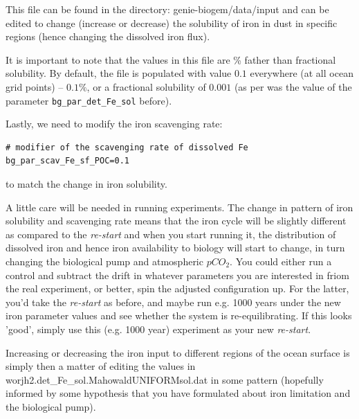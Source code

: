 \vspace{1mm}
This file can be found in the directory: \textsf{\footnotesize genie-biogem/data/input} and can be edited to change (increase or decrease) the solubility of iron in dust in specific regions (hence changing the dissolved iron flux). 

It is important to note that the values in this file are \% father than fractional solubility. By default, the file is populated with value \(0.1\) everywhere (at all ocean grid points) -- \(0.1\%\), or a fractional solubility of \(0.001\) (as per was the value of the parameter \texttt{\small bg\_par\_det\_Fe\_sol} before).

\vspace{1mm}
Lastly, we need to modify the iron scavenging rate:
\vspace{-1mm}\small\begin{verbatim}
# modifier of the scavenging rate of dissolved Fe
bg_par_scav_Fe_sf_POC=0.1
\end{verbatim}\normalsize\vspace{-1mm}
to match the change in iron solubility.

\vspace{1mm}
A little care will be needed in running experiments. The change in pattern of iron solubility and  scavenging rate means that the iron cycle will be slightly different as compared to the \textit{re-start} and when you start running it, the distribution of dissolved iron and hence iron availability to biology will start to change, in turn changing the biological pump and atmospheric \(pCO_{2}\). You could either run a control and subtract the drift in whatever parameters you are interested in friom the real experiment, or better, spin the adjusted configuration up. For the latter, you'd take the \textit{re-start} as before, and maybe run e.g. 1000 years under the new iron parameter values and see whether the system is re-equilibrating. If this looks 'good', simply use this (e.g. 1000 year) experiment as your new \textit{re-start}.

\vspace{1mm}
Increasing or decreasing the iron input to different regions of the ocean surface is simply then a matter of editing the values in \textsf{\footnotesize worjh2.det\_Fe\_sol.MahowaldUNIFORMsol.dat} in some pattern (hopefully informed by some hypothesis that you have formulated about iron limitation and the biological pump).

\newpage 

